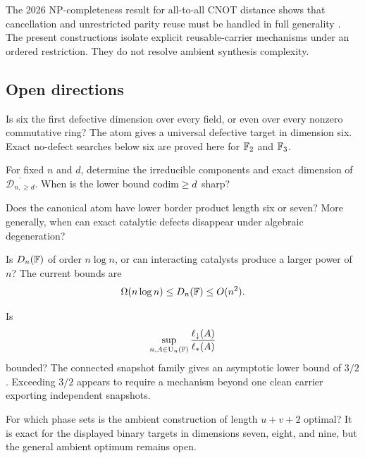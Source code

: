 The 2026 NP-completeness result for all-to-all CNOT distance shows that cancellation and unrestricted parity reuse must be handled in full generality \cite{AcuavivaEtAl2026}.  The present constructions isolate explicit reusable-carrier mechanisms under an ordered restriction.  They do not resolve ambient synthesis complexity.

\subsection{Open directions}

\begin{question}
Is six the first defective dimension over every field, or even over every nonzero commutative ring?  The atom gives a universal defective target in dimension six.  Exact no-defect searches below six are proved here for $\mathbb F_2$ and $\mathbb F_3$.
\end{question}

\begin{question}
For fixed $n$ and $d$, determine the irreducible components and exact dimension of $\overline{\mathcal D_{n,\ge d}}$.  When is the lower bound $\operatorname{codim}\ge d$ sharp?
\end{question}

\begin{question}
Does the canonical atom have lower border product length six or seven?  More generally, when can exact catalytic defects disappear under algebraic degeneration?
\end{question}

\begin{question}
Is $D_n(\mathbb F)$ of order $n\log n$, or can interacting catalysts produce a larger power of $n$?  The current bounds are
\[
\Omega(n\log n)
\le
D_n(\mathbb F)
\le
O(n^2).
\]
\end{question}

\begin{question}
Is
\[
\sup_{n,A\in\operatorname{U}_n(\mathbb F)}
\frac{\ell_{\downarrow}(A)}{\ell_{*}(A)}
\]
bounded?  The connected snapshot family gives an asymptotic lower bound of $3/2$.  Exceeding $3/2$ appears to require a mechanism beyond one clean carrier exporting independent snapshots.
\end{question}

\begin{question}
For which phase sets is the ambient construction of length $u+v+2$ optimal?  It is exact for the displayed binary targets in dimensions seven, eight, and nine, but the general ambient optimum remains open.
\end{question}


